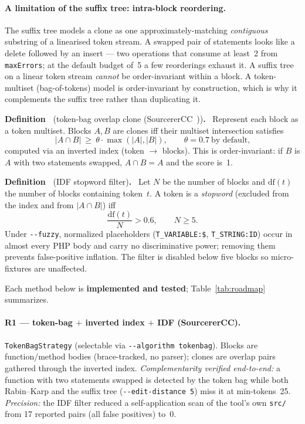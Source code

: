 \documentclass[10pt,a4paper]{article}
\newcounter{defn}[section]
\newcommand{\defn}[1]{\par\medskip\refstepcounter{defn}%
  \noindent\textbf{Definition~\thedefn} (#1)\textbf{.}\ }
\newcounter{lem}[section]
\begin{document}
\paragraph{A limitation of the suffix tree: intra-block reordering.} The suffix tree models a clone as
one approximately-matching \emph{contiguous} substring of a linearised token stream. A swapped pair of
statements looks like a delete followed by an insert --- two operations that consume at least~2 from
\texttt{maxErrors}; at the default budget of~5 a few reorderings exhaust it. A suffix tree on a
linear token stream \emph{cannot} be order-invariant within a block. A token-multiset
(bag-of-tokens) model is order-invariant by construction, which is why it complements the suffix tree
rather than duplicating it.

\defn{token-bag overlap clone (SourcererCC~\cite{sourcerercc})}
Represent each block as a token multiset. Blocks $A,B$ are clones iff their multiset intersection
satisfies
\[
|A\cap B|\ \ge\ \theta\cdot\max(|A|,|B|),\qquad \theta=0.7\ \text{by default,}
\]
computed via an inverted index (token $\rightarrow$ blocks). This is order-invariant: if $B$ is $A$
with two statements swapped, $A\cap B=A$ and the score is~1.

\defn{IDF stopword filter}
Let $N$ be the number of blocks and $\mathrm{df}(t)$ the number of blocks containing token~$t$.
A token is a \emph{stopword} (excluded from the index and from $|A\cap B|$) iff
\[
\frac{\mathrm{df}(t)}{N} > 0.6,\qquad N\ge 5.
\]
Under \texttt{-{}-fuzzy}, normalized placeholders (\lstinline!T_VARIABLE:$!, \lstinline!T_STRING:ID!)
occur in almost every PHP body and carry no discriminative power; removing them prevents
false-positive inflation. The filter is disabled below five blocks so micro-fixtures are unaffected.

Each method below is \textbf{implemented and tested}; Table~\ref{tab:roadmap} summarizes.

\paragraph{R1 --- token-bag $+$ inverted index $+$ IDF (SourcererCC).}
\lstinline!TokenBagStrategy! (selectable via \texttt{-{}-algorithm tokenbag}). Blocks are
function/method bodies (brace-tracked, no parser); clones are overlap pairs gathered through the
inverted index. \emph{Complementarity verified end-to-end:} a function with two statements swapped is
detected by the token bag while both Rabin--Karp and the suffix tree (\texttt{-{}-edit-distance 5})
miss it at min-tokens~25. \emph{Precision:} the IDF filter reduced a self-application scan of the tool's own
\texttt{src/} from 17 reported pairs (all false positives) to~0.
\end{document}
